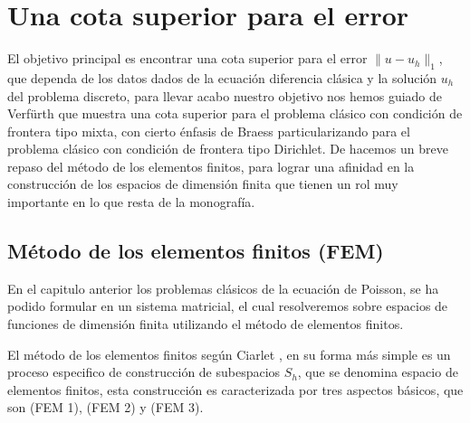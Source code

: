 \chapter{Una cota superior para el error}
El objetivo principal es encontrar una cota superior para el error $\|u-u_{h}\|_{1}$, que dependa de los datos dados de la ecuaci\'on diferencia cl\'asica  y la soluci\'on $u_{h}$ del problema discreto, para llevar acabo nuestro objetivo nos hemos guiado de Verf\"urth \cite[pp. 1-12]{Rudiger2013} que muestra una cota superior para el problema cl\'asico con condici\'on de frontera tipo mixta, con cierto \'enfasis de Braess \cite[pp. 172-175]{Dietrich2007} particularizando para el problema cl\'asico con condici\'on de frontera tipo Dirichlet. De \cite{Ciarlet1978} hacemos un breve repaso del m\'etodo de los elementos finitos, para lograr una afinidad en la construcci\'on de los espacios de dimensi\'on finita que tienen un rol muy importante en lo que resta de la monograf\'ia. 

\section{M\'etodo de los elementos finitos (FEM)}
En el capitulo anterior los problemas cl\'asicos de la ecuaci\'on de Poisson, se ha podido formular en un sistema matricial, el cual resolveremos sobre espacios de funciones de dimensi\'on finita utilizando el m\'etodo de elementos finitos.

El m\'etodo de los elementos finitos seg\'un Ciarlet \cite[pp. 55-60]{Ciarlet1978}, en su forma m\'as simple es un proceso especifico de construcci\'on de subespacios $S_{h}$, que se denomina espacio de elementos finitos, esta construcci\'on es caracterizada por tres aspectos b\'asicos, que son (FEM 1), (FEM 2) y (FEM 3).


